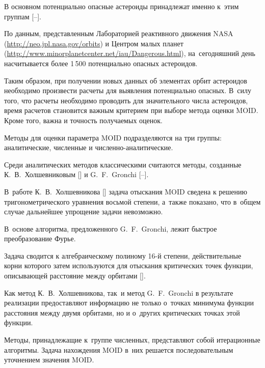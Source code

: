 В основном потенциально опасные астероиды принадлежат именно к~этим группам [--]. 

По данным, представленным Лабораторией реактивного движения NASA (\url{http://neo.jpl.nasa.gov/orbits}) и Центром малых планет (\url{http://www.minorplanetcenter.net/iau/Dangerous.html}), на~сегодняшний день насчитывается более 1\,500 потенциально опасных астероидов.



Таким образом, при получении новых данных об элементах орбит астероидов необходимо произвести расчеты для выявления потенциально опасных. В~силу того, что расчеты необходимо проводить для значительного числа астероидов, время расчетов становится важным критерием при выборе метода оценки MOID. Кроме того, важна и точность получаемых оценок.



Методы для оценки параметра MOID подразделяются на три группы: аналитические, численные и численно-аналитические.



Среди аналитических методов классическими считаются методы, созданные К.~В.~Холшевниковым [] и G.~F.~Gronchi [--]. 

В~работе К.~В.~Холшевникова [] задача отыскания MOID сведена к решению тригонометрического уравнения восьмой степени, а~также показано, что в~общем случае дальнейшее упрощение задачи невозможно. 

В~основе алгоритма, предложенного G.~F.~Gronchi, лежит быстрое преобразование Фурье. 

Задача сводится к алгебраическому полиному 16-й степени, действительные корни которого затем используются для отыскания критических точек функции, описывающей расстояние между орбитами []. 

Как метод К.~В.~Холшевникова, так~и метод G.~F.~Gronchi в результате реализации предоставляют информацию не только о~точках минимума функции расстояния между двумя орбитами, но и о~других критических точках этой функции.



Методы, принадлежащие к~группе численных, представляют собой итерационные алгоритмы. Задача нахождения MOID в~них решается последовательным уточнением значения MOID. 

